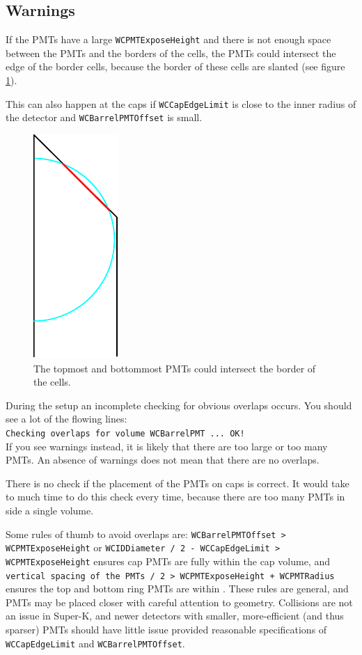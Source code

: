 \subsection{Warnings}
If the PMTs have a large \texttt{WCPMTExposeHeight} and there is not enough space between the PMTs and the borders of the cells, the PMTs could intersect the edge of the border cells, because the border of these cells are slanted (see figure \ref{fig:warning}).
\label{sec:warnings} 

This can also happen at the caps if \texttt{WCCapEdgeLimit} is close to the inner radius of the detector and \texttt{WCBarrelPMTOffset} is small.

\begin{figure}[t]
  \begin{center}
\includegraphics{warning}
  \end{center}
\caption{The topmost and bottommost PMTs could  intersect the border of the cells.} \label{fig:warning}
\end{figure}

During the setup an incomplete checking for obvious overlaps occurs. You should see a lot of the flowing lines:\\
\texttt{Checking overlaps for volume WCBarrelPMT ... OK!}\\
If you see warnings instead, it is likely that there are too large or too many PMTs.  An absence of warnings does not mean that there are no overlaps.

There is no check if the placement of the PMTs on caps is correct. It would take to much time to do this check every time, because there are too many PMTs in side a single volume.

Some rules of thumb to avoid overlaps are: \texttt{WCBarrelPMTOffset > WCPMTExposeHeight} or \texttt{WCIDDiameter / 2 - WCCapEdgeLimit > WCPMTExposeHeight} ensures cap PMTs are fully within the cap volume, and \texttt{vertical spacing of the PMTs / 2 > WCPMTExposeHeight + WCPMTRadius} ensures the top and bottom ring PMTs are within .  These rules are general, and PMTs may be placed closer with careful attention to geometry.  Collisions are not an issue in Super-K, and newer detectors with smaller, more-efficient (and thus sparser) PMTs should have little issue provided reasonable specifications of \texttt{WCCapEdgeLimit} and \texttt{WCBarrelPMTOffset}.
 
